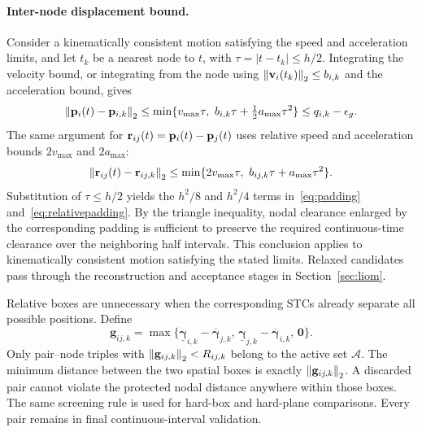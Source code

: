 \paragraph{Inter-node displacement bound.}
Consider a kinematically consistent motion satisfying the speed and acceleration limits, and let $t_k$ be a nearest node to $t$, with $\tau=|t-t_k|\leq h/2$. Integrating the velocity bound, or integrating from the node using $\left\lVert \mathbf{v}_i(t_k)\right\rVert_2\leq b_{i,k}$ and the acceleration bound, gives
\begin{equation}
 \left\lVert \mathbf{p}_i(t)-\mathbf{p}_{i,k}\right\rVert_2
 \leq\min\{v_{\max}\tau,\ b_{i,k}\tau+\tfrac12a_{\max}\tau^2\}
 \leq q_{i,k}-\epsilon_g.
 \label{eq:single-displacement}
\end{equation}
The same argument for $\mathbf r_{ij}(t)=\mathbf{p}_i(t)-\mathbf{p}_j(t)$ uses relative speed and acceleration bounds $2v_{\max}$ and $2a_{\max}$:
\begin{equation}
 \left\lVert \mathbf r_{ij}(t)-\mathbf r_{ij,k}\right\rVert_2
 \leq\min\{2v_{\max}\tau,\ b_{ij,k}\tau+a_{\max}\tau^2\}.
 \label{eq:relative-displacement}
\end{equation}
Substitution of $\tau\leq h/2$ yields the $h^2/8$ and $h^2/4$ terms in~\eqref{eq:padding} and~\eqref{eq:relativepadding}. By the triangle inequality, nodal clearance enlarged by the corresponding padding is sufficient to preserve the required continuous-time clearance over the neighboring half intervals. This conclusion applies to kinematically consistent motion satisfying the stated limits. Relaxed candidates pass through the reconstruction and acceptance stages in Section~\ref{sec:liom}.

Relative boxes are unnecessary when the corresponding STCs already separate all possible positions. Define
\begin{equation}
 \mathbf g_{ij,k}=\max\{\underline{\boldsymbol\gamma}_{i,k}-\overline{\boldsymbol\gamma}_{j,k},\,
 \underline{\boldsymbol\gamma}_{j,k}-\overline{\boldsymbol\gamma}_{i,k},\,\mathbf0\}.
 \label{eq:screen}
\end{equation}
Only pair--node triples with $\left\lVert \mathbf g_{ij,k}\right\rVert_2<R_{ij,k}$ belong to the active set $\mathcal A$. The minimum distance between the two spatial boxes is exactly $\left\lVert \mathbf g_{ij,k}\right\rVert_2$. A discarded pair cannot violate the protected nodal distance anywhere within those boxes. The same screening rule is used for hard-box and hard-plane comparisons. Every pair remains in final continuous-interval validation.

